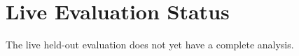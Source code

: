 \section{Live Evaluation Status}
The live held-out evaluation does not yet have a complete analysis.
